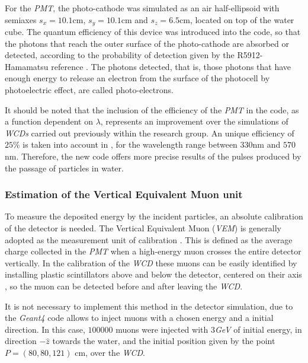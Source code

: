 \documentclass[submitting]{nst}
\begin{document}
For the \textsl{PMT}, the photo-cathode was simulated as an air half-ellipsoid with semiaxes $s_x=10.1$cm, $ s_y = 10.1$cm and $s_z=6.5$cm, located on top of the water cube. The quantum efficiency of this device was introduced into the code, so that the photons that reach the outer surface of the photo-cathode are absorbed or detected, according to the probability of detection given by the R5912-Hamamatsu reference \cite{Hamamatsu2018}. The photons detected, that is, those photons that have enough energy to release an electron from the surface of the photocell by photoelectric effect, are called photo-electrons.
 
It should be noted that the inclusion of the efficiency of the \textsl{PMT} in the code, as a function dependent on $\lambda$, represents an improvement over the simulations of \textsl{WCDs} carried out previously within the research group. An unique efficiency of $25$\% is taken into account in \cite{CalderonAsoreyNunez2015}, for the wavelength range between $330$nm and $570$nm. Therefore, the new code offers more precise results of the pulses produced by the passage of particles in water. 
 
 \subsubsection{Estimation of the Vertical Equivalent Muon unit}
 To measure the deposited energy by the incident particles, an absolute calibration of the detector is needed. The Vertical Equivalent Muon (\textsl{VEM}) is generally adopted as the measurement unit of calibration \cite{EtchegoyenEtal2005}. This is defined as the average charge collected in the \textsl{PMT} when a high-energy muon crosses the entire detector vertically. In the calibration of the \textsl{WCD} these muons can be easily identified by installing plastic scintillators above and below the detector, centered on their axis \cite{EtchegoyenEtal2005}, so the muon can be detected before and after leaving the \textsl{WCD}.
 
It is not necessary to implement this method in the detector simulation, due to the \textsl{Geant4} code allows to inject muons with a chosen energy and a initial direction. In this case, $100000$ muons were injected with $3$\textsl{GeV}   of initial energy, in direction $-\hat{z}$ towards the water, and the initial position given by the point $ P=(80, 80, 121)$ cm, over the \textsl{WCD}. 
\end{document}
